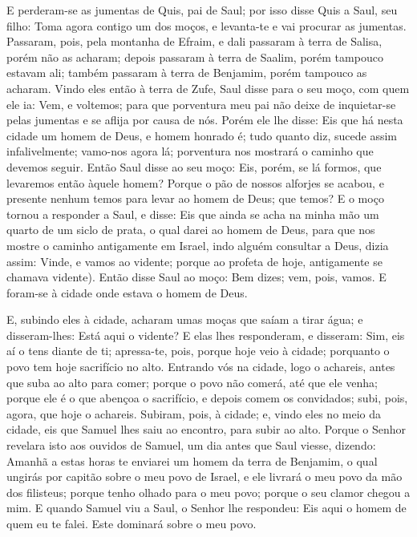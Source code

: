 E perderam-se as jumentas de Quis, pai de Saul; por isso disse
Quis a Saul, seu filho: Toma agora contigo um dos moços, e
levanta-te e vai procurar as jumentas. Passaram, pois, pela
montanha de Efraim, e dali passaram à terra de Salisa, porém não as
acharam; depois passaram à terra de Saalim, porém tampouco estavam
ali; também passaram à terra de Benjamim, porém tampouco as acharam.
Vindo eles então à terra de Zufe, Saul disse para o seu moço,
com quem ele ia: Vem, e voltemos; para que porventura meu pai não
deixe de inquietar-se pelas jumentas e se aflija por causa de nós.
Porém ele lhe disse: Eis que há nesta cidade um homem de Deus, e
homem honrado é; tudo quanto diz, sucede assim infalivelmente;
vamo-nos agora lá; porventura nos mostrará o caminho que devemos
seguir. Então Saul disse ao seu moço: Eis, porém, se lá formos,
que levaremos então àquele homem? Porque o pão de nossos alforjes se
acabou, e presente nenhum temos para levar ao homem de Deus; que
temos? E o moço tornou a responder a Saul, e disse: Eis que
ainda se acha na minha mão um quarto de um siclo de prata, o qual
darei ao homem de Deus, para que nos mostre o caminho
antigamente em Israel, indo alguém consultar a Deus, dizia
assim: Vinde, e vamos ao vidente; porque ao profeta de hoje,
antigamente se chamava vidente). Então disse Saul ao moço:
Bem dizes; vem, pois, vamos. E foram-se à cidade onde estava o homem
de Deus.

E, subindo eles à cidade, acharam umas moças que saíam a tirar
água; e disseram-lhes: Está aqui o vidente? E elas lhes
responderam, e disseram: Sim, eis aí o tens diante de ti;
apressa-te, pois, porque hoje veio à cidade; porquanto o povo tem
hoje sacrifício no alto. Entrando vós na cidade, logo o
achareis, antes que suba ao alto para comer; porque o povo não
comerá, até que ele venha; porque ele é o que abençoa o sacrifício,
e depois comem os convidados; subi, pois, agora, que hoje o
achareis. Subiram, pois, à cidade; e, vindo eles no meio da
cidade, eis que Samuel lhes saiu ao encontro, para subir ao alto.
Porque o Senhor revelara isto aos ouvidos de Samuel, um dia
antes que Saul viesse, dizendo: Amanhã a estas horas te
enviarei um homem da terra de Benjamim, o qual ungirás por capitão
sobre o meu povo de Israel, e ele livrará o meu povo da mão dos
filisteus; porque tenho olhado para o meu povo; porque o seu clamor
chegou a mim. E quando Samuel viu a Saul, o Senhor lhe
respondeu: Eis aqui o homem de quem eu te falei. Este dominará sobre
o meu povo.


